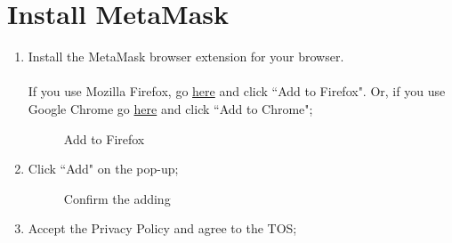 \documentclass[ManualeUtente.tex]{subfiles}
\begin{document}
\section{Install MetaMask}
\begin{enumerate}
	\item Install the MetaMask browser extension for your browser.\\\\
	If you use Mozilla Firefox, go
	\href{https://addons.mozilla.org/en-US/firefox/addon/ether-metamask/}{here}
	and click \textquotedblleft Add to Firefox". Or, if you use Google Chrome go \href{https://chrome.google.com/webstore/detail/metamask/nkbihfbeogaeaoehlefnkodbefgpgknn}{here} and click \textquotedblleft Add to Chrome";
	\begin{figure}[H]
		\centering
		\caption{Add to Firefox}
		\label{fig:Add to Firefox}
	\end{figure}
	\item Click \textquotedblleft Add" on the pop-up;
	\begin{figure}[H]
		\centering
		\caption{Confirm the adding}
		\label{fig:Confirm the adding}
	\end{figure}
	\item Accept the Privacy Policy and agree to the TOS;
\end{enumerate}
\end{document}
